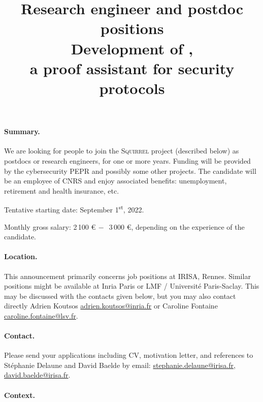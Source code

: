 \documentclass[10pt,a4paper]{article}
\title{\vspace{-1em} {\bf Research engineer and postdoc positions} \\[3mm]
 {Development of \Squirrel, \\
  a proof assistant for security protocols}}
\author{}
\date{}
\newcommand{\Squirrel}{\textsc{Squirrel}\xspace}
\begin{document}
\maketitle



\paragraph*{Summary.}
We are looking for people to join the \Squirrel project (described below)
as postdocs or research engineers, for one or more years.
Funding will be provided by the cybersecurity PEPR and possibly some
other projects.
The candidate will be an employee of CNRS and enjoy associated benefits:
unemployment, retirement and health insurance, etc.

\noindent Tentative starting date: September 1\textsuperscript{st}, 2022.

\noindent Monthly gross salary: 2\,100 \euro $ \,-\,$ 3\,000 \euro, depending on the experience of the candidate.

\paragraph{Location.}
This announcement primarily concerns job positions at IRISA, Rennes.
Similar positions might be available at Inria Paris or LMF / Université
Paris-Saclay. This may be discussed with the contacts given below,
but you may also contact directly Adrien Koutsos \url{adrien.koutsos@inria.fr}
or Caroline Fontaine \url{caroline.fontaine@lsv.fr}.

\paragraph*{Contact.} 
Please send your applications including
CV, motivation letter, and references to Stéphanie Delaune and
David Baelde by email: \url{stephanie.delaune@irisa.fr},
\url{david.baelde@irisa.fr}.





\paragraph*{Context.}
\end{document}
